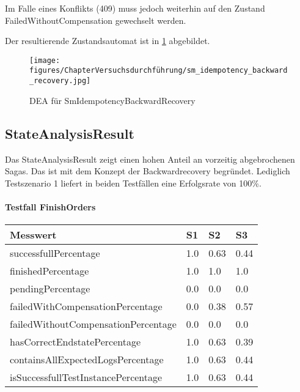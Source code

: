 Im Falle eines Konflikts (409) muss jedoch weiterhin auf den Zustand FailedWithoutCompensation gewechselt werden.

Der resultierende Zustandsautomat ist in \cref{fig:fig_sm_idempotency_backward_recovery} abgebildet.

\begin{figure}[h!]
	\centering
	\texttt{[image: figures/ChapterVersuchsdurchführung/sm\_idempotency\_backward\_recovery.jpg]}
	\caption{DEA für SmIdempotencyBackwardRecovery}
	\label{fig:fig_sm_idempotency_backward_recovery}
\end{figure}
\FloatBarrier

\subsection{StateAnalysisResult}

Das StateAnalysisResult zeigt einen hohen Anteil an vorzeitig abgebrochenen Sagas. Das ist mit dem Konzept der Backwardrecovery begründet. Lediglich Testszenario 1 liefert in beiden Testfällen eine Erfolgsrate von 100\%.

\paragraph*{Testfall FinishOrders}

\begin{center}
	\fontsize{9}{12}\selectfont
	\begin{longtable}[h]{|p{5cm}|p{1cm}|p{1cm}|p{1cm}|}
		\hline
		Messwert & S1 & S2 & S3 \\ \hline
		\endhead
		\endfoot
		successfull\-Percentage & 1.0 & 0.63 & 0.44 \\ \hline
		finished\-Percentage & 1.0 & 1.0 & 1.0 \\ \hline
		pending\-Percentage & 0.0 & 0.0 & 0.0 \\ \hline
		failedWithCompensation\-Percentage & 0.0 & 0.38 & 0.57 \\ \hline
		failedWithoutCompensation\-Percentage & 0.0 & 0.0 & 0.0 \\ \hline
		hasCorrectEndstate\-Percentage & 1.0 & 0.63 & 0.39 \\ \hline
		containsAllExpectedLogs\-Percentage & 1.0 & 0.63 & 0.44 \\ \hline
		isSuccessfullTestInstance\-Percentage & 1.0 & 0.63 & 0.44 \\ \hline
	\end{longtable}
\end{center}
\FloatBarrier

